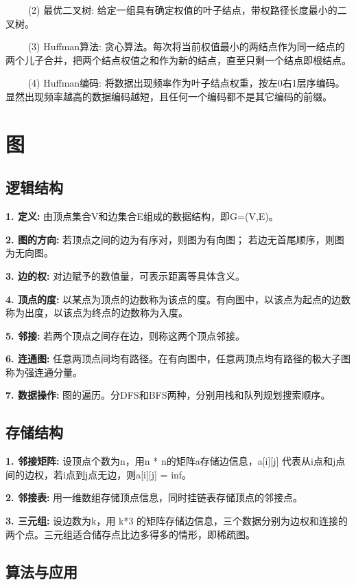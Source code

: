 ~~~~ (2) 最优二叉树: 给定一组具有确定权值的叶子结点，带权路径长度最小的二叉树。

~~~~ (3) Huffman算法: 贪心算法。每次将当前权值最小的两结点作为同一结点的两个儿子合并，把两个结点权值之和作为新的结点，直至只剩一个结点即根结点。

~~~~ (4) Huffman编码: 将数据出现频率作为叶子结点权重，按左0右1层序编码。显然出现频率越高的数据编码越短，且任何一个编码都不是其它编码的前缀。

\section{图}

\subsection{逻辑结构}

\textbf{1. 定义: }由顶点集合V和边集合E组成的数据结构，即G=(V,E)。

\textbf{2. 图的方向: }若顶点之间的边为有序对，则图为有向图； 若边无首尾顺序，则图为无向图。

\textbf{3. 边的权: }对边赋予的数值量，可表示距离等具体含义。

\textbf{4. 顶点的度: }以某点为顶点的边数称为该点的度。有向图中，以该点为起点的边数称为出度，以该点为终点的边数称为入度。

\textbf{5. 邻接: }若两个顶点之间存在边，则称这两个顶点邻接。

\textbf{6. 连通图: }任意两顶点间均有路径。在有向图中，任意两顶点均有路径的极大子图称为强连通分量。

\textbf{7. 数据操作: }图的遍历。分DFS和BFS两种，分别用栈和队列规划搜索顺序。

\subsection{存储结构}

\textbf{1. 邻接矩阵: }设顶点个数为n，用n * n的矩阵a存储边信息，a[i][j] 代表从i点和j点间的边权，若i点到j点无边，则a[i][j] = inf。

\textbf{2. 邻接表: }用一维数组存储顶点信息，同时挂链表存储顶点的邻接点。

\textbf{3. 三元组: }设边数为k，用 k*3 的矩阵存储边信息，三个数据分别为边权和连接的两个点。三元组适合储存点比边多得多的情形，即稀疏图。

\subsection{算法与应用}

